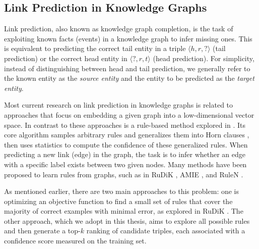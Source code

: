 \subsection{Link Prediction in Knowledge Graphs}


Link prediction, also known as knowledge graph completion, is the task of exploiting known facts (events) in a knowledge graph to infer missing ones. This is equivalent to predicting the correct tail entity in a triple $\langle h, r, ? \rangle$ (tail prediction) or the correct head entity in $\langle ?, r, t \rangle$ (head prediction). For simplicity, instead of distinguishing between head and tail prediction, we generally refer to the known entity as the \textit{source entity} and the entity to be predicted as the \textit{target entity}.

Most current research on link prediction in knowledge graphs is related to approaches that focus on embedding a given graph into a low-dimensional vector space. In contrast to these approaches is a rule-based method explored in \cite{burl}. Its core algorithm samples arbitrary rules and generalizes them into Horn clauses \cite{wiki:Horn}, then uses statistics to compute the confidence of these generalized rules. When predicting a new link (edge) in the graph, the task is to infer whether an edge with a specific label exists between two given nodes. Many methods have been proposed to learn rules from graphs, such as in RuDiK \cite{ortona2018robust}, AMIE \cite{galarraga2015fast}, and RuleN \cite{meilicke2018fine}.

As mentioned earlier, there are two main approaches to this problem: one is optimizing an objective function to find a small set of rules that cover the majority of correct examples with minimal error, as explored in RuDiK \cite{ortona2018robust}. The other approach, which we adopt in this thesis, aims to explore all possible rules and then generate a top-\(k\) ranking of candidate triples, each associated with a confidence score measured on the training set.


